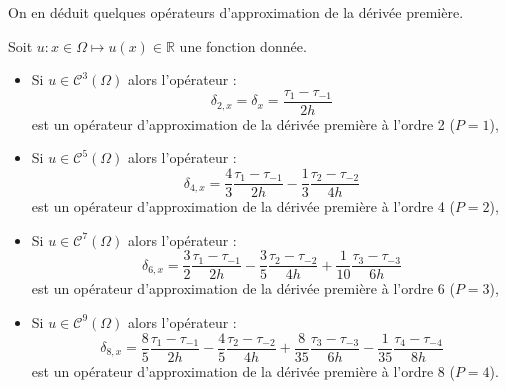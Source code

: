 On en déduit quelques opérateurs d'approximation de la dérivée première.
\begin{corollaire}
Soit $u :  x \in \Omega \mapsto u(x) \in \mathbb{R}$ une fonction donnée. 
\begin{itemize}
\item Si $u \in \mathcal{C}^3 (\Omega)$ alors l'opérateur :
\begin{equation}
\delta_{2,x} = \delta_x = \dfrac{\tau_1 - \tau_{-1}}{2h}
\label{eq:derprem_order2}
\end{equation}
est un opérateur d'approximation de la dérivée première à l'ordre 2 ($P=1$),
\item Si $u \in \mathcal{C}^5 (\Omega)$ alors l'opérateur :
\begin{equation}
\delta_{4,x} = \dfrac{4}{3} \dfrac{\tau_1 - \tau_{-1}}{2h} - \dfrac{1}{3} \dfrac{\tau_2 - \tau_{-2}}{4h}
\label{eq:derprem_order4}
\end{equation}
est un opérateur d'approximation de la dérivée première à l'ordre 4 ($P=2$),
\item Si $u \in \mathcal{C}^7 (\Omega)$ alors l'opérateur :
\begin{equation}
\delta_{6,x} = \dfrac{3}{2} \dfrac{\tau_1 - \tau_{-1}}{2h} - \dfrac{3}{5} \dfrac{\tau_2 - \tau_{-2}}{4h} + \dfrac{1}{10} \dfrac{\tau_3 - \tau_{-3}}{6h}
\label{eq:derprem_order6}
\end{equation}
est un opérateur d'approximation de la dérivée première à l'ordre 6 ($P=3$),
\item Si $u \in \mathcal{C}^9 (\Omega)$ alors l'opérateur :
\begin{equation}
\delta_{8,x} = \dfrac{8}{5} \dfrac{\tau_1 - \tau_{-1}}{2h} - \dfrac{4}{5} \dfrac{\tau_2 - \tau_{-2}}{4h} + \dfrac{8}{35} \dfrac{\tau_3 - \tau_{-3}}{6h} - \dfrac{1}{35} \dfrac{\tau_4 - \tau_{-4}}{8h}
\label{eq:derprem_order8}
\end{equation}
est un opérateur d'approximation de la dérivée première à l'ordre 8 ($P=4$).
\end{itemize}
\end{corollaire} 














